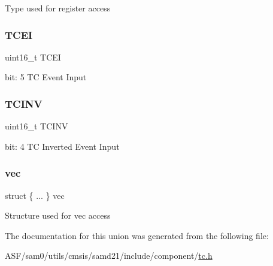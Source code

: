 Type used for register access \mbox{\label{union_t_c___e_v_c_t_r_l___type_a7001429c571317c6c85f60ece4a63783}} 
\subsubsection{\texorpdfstring{TCEI}{TCEI}}
{\footnotesize\ttfamily uint16\+\_\+t T\+C\+EI}

bit\+: 5 TC Event Input \mbox{\label{union_t_c___e_v_c_t_r_l___type_a43edaf20b36303cc4856be3c7f3aec4e}} 
\subsubsection{\texorpdfstring{TCINV}{TCINV}}
{\footnotesize\ttfamily uint16\+\_\+t T\+C\+I\+NV}

bit\+: 4 TC Inverted Event Input \mbox{\label{union_t_c___e_v_c_t_r_l___type_a603dc73568af5c61f7e5731b4edbb877}} 
\subsubsection{\texorpdfstring{vec}{vec}}
{\footnotesize\ttfamily struct \{ ... \}   vec}

Structure used for vec access 

The documentation for this union was generated from the following file\+:\begin{DoxyCompactItemize}
\item 
A\+S\+F/sam0/utils/cmsis/samd21/include/component/\mbox{\hyperlink{utils_2cmsis_2samd21_2include_2component_2tc_8h}{tc.\+h}}\end{DoxyCompactItemize}
